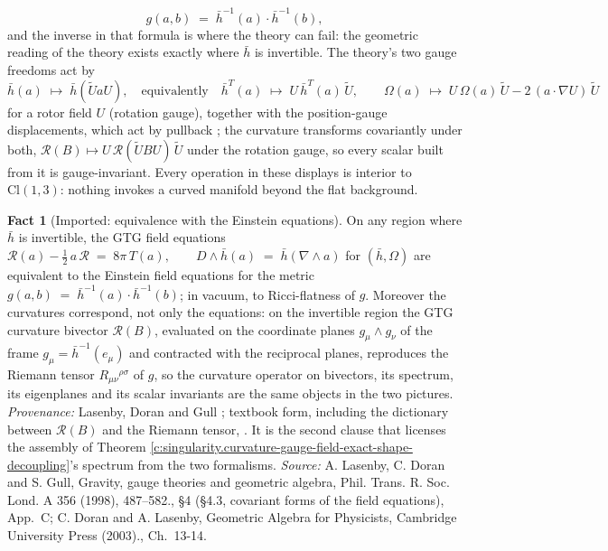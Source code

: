 \documentclass[11pt]{article}
\theoremstyle{definition}
\newtheorem{fact}[theorem]{Fact}
\theoremstyle{plain}
\providecommand{\Cl}{}\renewcommand{\Cl}{\mathrm{Cl}}
\providecommand{\hb}{}\renewcommand{\hb}{\bar{h}}
\begin{document}
\begin{equation}
g(a,b) \;=\; \hb^{-1}(a) \cdot \hb^{-1}(b),
\end{equation}
and the inverse in that formula is where the theory can fail: the geometric reading of the theory exists exactly where $\hb$ is invertible. The theory's two gauge freedoms act by
\begin{equation}
\hb(a) \;\mapsto\; \hb(\tilde U a U), \quad\text{equivalently}\quad \hb^{T}(a) \;\mapsto\; U\,\hb^{T}(a)\,\tilde U, \qquad
\Omega(a) \;\mapsto\; U\,\Omega(a)\,\tilde U - 2\,(a\cdot\nabla U)\,\tilde U
\end{equation}
for a rotor field $U$ (rotation gauge), together with the position-gauge displacements, which act by pullback \cite{LDG1998}; the curvature transforms covariantly under both, $\mathcal{R}(B) \mapsto U\,\mathcal{R}(\tilde U B U)\,\tilde U$ under the rotation gauge, so every scalar built from it is gauge-invariant. Every operation in these displays is interior to $\Cl(1,3)$: nothing invokes a curved manifold beyond the flat background.

\begin{fact}[Imported: equivalence with the Einstein equations]\label{c:singularity.imported-equivalence-einstein-equations}
On any region where $\hb$ is invertible, the GTG field equations $\mathcal{R}(a) - \tfrac12\, a\, \mathcal{R} \;=\; 8\pi\, T(a), \qquad D \wedge \hb(a) \;=\; \hb(\nabla \wedge a)$ for $(\hb, \Omega)$ are equivalent to the Einstein field equations for the metric $g(a,b) \;=\; \hb^{-1}(a) \cdot \hb^{-1}(b)$; in vacuum, to Ricci-flatness of $g$. Moreover the curvatures correspond, not only the equations: on the invertible region the GTG curvature bivector $\mathcal{R}(B)$, evaluated on the coordinate planes $g_\mu \wedge g_\nu$ of the frame $g_\mu = \hb^{-1}(e_\mu)$ and contracted with the reciprocal planes, reproduces the Riemann tensor $R_{\mu\nu}{}^{\rho\sigma}$ of $g$, so the curvature operator on bivectors, its spectrum, its eigenplanes and its scalar invariants are the same objects in the two pictures. \emph{Provenance:} Lasenby, Doran and Gull \cite[\S 4.3 and App.~C]{LDG1998}; textbook form, including the dictionary between $\mathcal{R}(B)$ and the Riemann tensor, \cite[Ch.~13-14]{DoranLasenby2003}. It is the second clause that licenses the assembly of Theorem \ref{c:singularity.curvature-gauge-field-exact-shape-decoupling}'s spectrum from the two formalisms.
\emph{Source:} A. Lasenby, C. Doran and S. Gull, Gravity, gauge theories and geometric algebra, Phil. Trans. R. Soc. Lond. A 356 (1998), 487--582., \S 4 (\S 4.3, covariant forms of the field equations), App.~C; C. Doran and A. Lasenby, Geometric Algebra for Physicists, Cambridge University Press (2003)., Ch.~13-14.
\end{fact}
\end{document}
